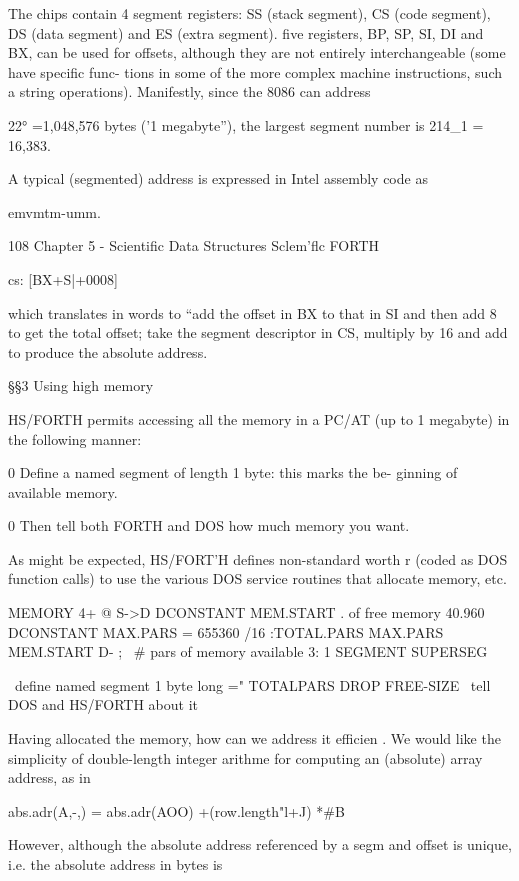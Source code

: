 {The chips contain 4 segment registers: SS (stack segment), CS
(code segment), DS (data segment) and ES (extra segment). five
registers, BP, SP, SI, DI and BX, can be used for offsets, although
they are not entirely interchangeable (some have specific func-
tions in some of the more complex machine instructions, such a
string operations). Manifestly, since the 8086 can address

22° =1,048,576 bytes ('1 megabyte”),
the largest segment number is 214_1 = 16,383.

A typical (segmented) address is expressed in Intel assembly code
as

emvmtm-umm.

108 Chapter 5 - Scientific Data Structures Sclem'flc FORTH

cs: [BX+S|+0008]

which translates in words to “add the offset in BX to that in SI
and then add 8 to get the total offset; take the segment descriptor
in CS, multiply by 16 and add to produce the absolute address.

§§3 Using high memory

HS/FORTH permits accessing all the memory in a PC/AT (up
to 1 megabyte) in the following manner:

0 Define a named segment of length 1 byte: this marks the be-
ginning of available memory.

0 Then tell both FORTH and DOS how much memory you want.

 

As might be expected, HS/FORT'H defines non-standard worth r
(coded as DOS function calls) to use the various DOS service
routines that allocate memory, etc.

MEMORY 4+ @ S->D
DCONSTANT MEM.START \beg. of free memory
40.960 DCONSTANT MAX.PARS
 = 655360 /16
:TOTAL.PARS MAX.PARS MEM.START D- ;
\ # pars of memory available 3:
1 SEGMENT SUPERSEG }
\ define named segment 1 byte long ="
TOTALPARS DROP FREE-SIZE
\ tell DOS and HS/FORTH about it

   
 
    
  

Having allocated the memory, how can we address it efficien .
We would like the simplicity of double-length integer arithme
for computing an (absolute) array address, as in

abs.adr(A,-,) = abs.adr(AOO) +(row.length"l+J) *#B

However, although the absolute address referenced by a segm
and offset is unique, i.e. the absolute address in bytes is

